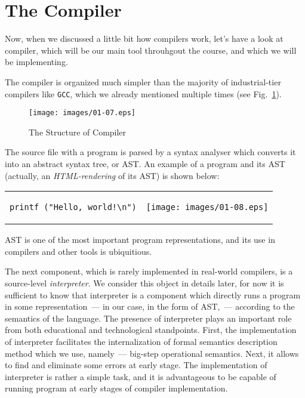\section{The \lama Compiler}

Now, when we discussed a little bit how compilers work, let's have a look at \lama compiler, which will be our main
tool throuhgout the course, and which we will be implementing.

The \lama compiler is organized much simpler than the majority of industrial-tier compilers like \texttt{GCC}, which we already
mentioned multiple times (see Fig.~\ref{lama-comp}).

\begin{figure}[t]
  \centering
  \texttt{[image: images/01-07.eps]}
  \caption{The Structure of \lama Compiler}
  \label{lama-comp}
\end{figure}

The source file with a \lama program is parsed by a syntax analyser which converts it into an
abstract syntax tree, or AST. An example of a program and its AST (actually, an \emph{HTML-rendering}
of its AST) is shown below:

\begin{tabular}{m{5cm}m{5cm}}
  \begin{lstlisting}[basicstyle=\small]
 printf ("Hello, world!\n")
  \end{lstlisting} &
  \texttt{[image: images/01-08.eps]}
\end{tabular}

AST is one of the most important program representations, and its use in compilers and other
tools is ubiquitious. 

The next component, which is rarely implemented in real-world compilers, is a source-level \emph{interpreter}. We
consider this object in details later, for now it is sufficient to know that interpreter is a component which
directly runs a program in some representation~--- in our case, in the form of AST,~--- according to the semantics of the language. 
The presence of interpreter plays an important role from both educational and technological standpoints. First,
the implementation of interpreter facilitates the internalization of formal semantics description method which
we use, namely~--- big-step operational semantics. Next, it allows to find and eliminate some errors 
at early stage. The implementation of interpreter is rather a simple task, and it is advantageous to be capable of running program
at early stages of compiler implementation.

